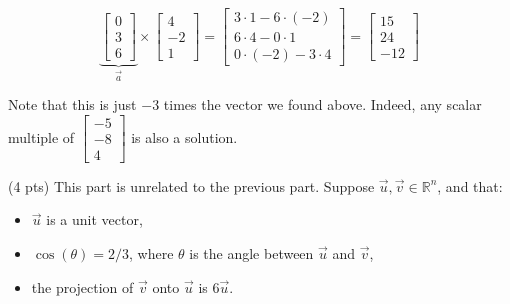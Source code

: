 \documentclass[11pt]{article}
\begin{document}
\begin{prob}
\begin{subprob}
\begin{solution}
$$\underbrace{\begin{bmatrix} 0 \\ 3 \\ 6 \end{bmatrix}}_{\vec a} \times \begin{bmatrix} 4 \\ -2 \\ 1 \end{bmatrix} = \begin{bmatrix} 3 \cdot 1 - 6 \cdot (-2) \\ 6 \cdot 4 - 0 \cdot 1 \\ 0 \cdot (-2) - 3 \cdot 4 \end{bmatrix} = \boxed{\begin{bmatrix} 15 \\ 24 \\ -12 \end{bmatrix}}$$

Note that this is just $-3$ times the vector we found above. Indeed, any scalar multiple of $\begin{bmatrix} -5 \\ -8 \\ 4 \end{bmatrix}$ is also a solution.

\end{solution}
\end{subprob}




\begin{subprob}(4 pts) This part is unrelated to the previous part. Suppose $\vec u, \vec v \in \mathbb{R}^n$, and that:
\begin{itemize}
    \item $\vec u$ is a unit vector,
    \item $\cos(\theta) = 2/3$, where $\theta$ is the angle between $\vec u$ and $\vec v$,
    \item the projection of $\vec v$ onto $\vec u$ is $6 \vec u$.
\end{itemize} 


\end{subprob}
\end{prob}
\end{document}
